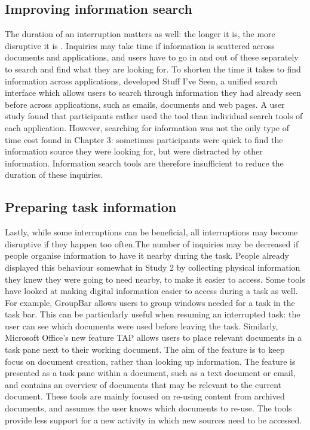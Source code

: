 \subsection{Improving information search}
The duration of an interruption matters as well: the longer it is, the more disruptive it is \citep{Altmann2017, Monk2008}. Inquiries may take time  if information is scattered across documents and applications, and users have to go in and out of these separately to search and find what they are looking for. To shorten the time it takes to find information across applications, \citet{Dumais2003} developed Stuff I’ve Seen, a unified search interface which allows users to search through information they had already seen before across applications, such as emails, documents and web pages. A user study found that participants rather used the tool than individual search tools of each application. However, searching for information was not the only type of time cost found in Chapter 3: sometimes participants were quick to find the information source they were looking for, but were distracted by other information. Information search tools are therefore insufficient to reduce the duration of these inquiries. 

\subsection{Preparing task information}
Lastly, while some interruptions can be beneficial, all interruptions may become disruptive if they happen too often.The number of inquiries may be decreased if people organise information to have it nearby during the task. People already displayed this behaviour somewhat in Study 2 by collecting physical information they knew they were going to need nearby, to make it easier to access. Some tools have looked at making digital information easier to access during a task as well. For example, GroupBar \citet{Smith2003} allows users to group windows needed for a task in the task bar. This can be particularly useful when resuming an interrupted task: the user can see which documents were used before leaving the task. Similarly, Microsoft Office’s new feature TAP allows users to place relevant documents in a task pane next to their working document. The aim of the feature is to keep focus on document creation, rather than looking up information. The feature is presented as a task pane within a document, such as a text document or email, and contains an overview of documents that may be relevant to the current document. These tools are mainly focused on re-using content from archived documents, and assumes the user knows which documents to re-use. The tools provide less support for a new activity in which new sources need to be accessed. 

